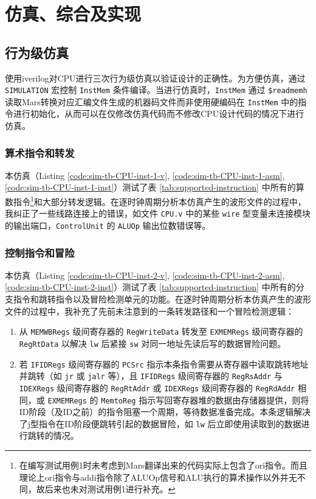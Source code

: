 \section{仿真、综合及实现}

\subsection{行为级仿真}
使用iverilog对CPU进行三次行为级仿真以验证设计的正确性。为方便仿真，通过 \lstinline|SIMULATION| 宏控制 \lstinline|InstMem| 条件编译。当进行仿真时，\lstinline|InstMem| 通过 \lstinline|$readmemh| 读取Mars转换对应汇编文件生成的机器码文件而非使用硬编码在 \lstinline|InstMem| 中的指令进行初始化，从而可以在仅修改仿真代码而不修改CPU设计代码的情况下进行仿真。

\subsubsection{算术指令和转发}
\label{subsubsec:sim-arithmetic-instructions}
本仿真（Listing \ref{code:sim-tb-CPU-inst-1-v}, \ref{code:sim-tb-CPU-inst-1-asm}, \ref{code:sim-tb-CPU-inst-1-inst}）测试了表 \ref{tab:supported-instruction} 中所有的算数指令\footnote{在编写测试用例1时未考虑到Mars翻译出来的代码实际上包含了ori指令。而且理论上ori指令与addi指令除了ALUOp信号和ALU执行的算术操作以外并无不同，故后来也未对测试用例1进行补充。}和大部分转发逻辑。在逐时钟周期分析本仿真产生的波形文件的过程中，我纠正了一些线路连接上的错误，如文件 \lstinline|CPU.v| 中的某些 \lstinline|wire| 型变量未连接模块的输出端口，\lstinline|ControlUnit| 的 \lstinline|ALUOp| 输出位数错误等。

\subsubsection{控制指令和冒险}
\label{subsubsec:sim-control-instructions}
本仿真（Listing \ref{code:sim-tb-CPU-inst-2-v}, \ref{code:sim-tb-CPU-inst-2-asm}, \ref{code:sim-tb-CPU-inst-2-inst}）测试了表 \ref{tab:supported-instruction} 中所有的分支指令和跳转指令以及冒险检测单元的功能。在逐时钟周期分析本仿真产生的波形文件的过程中，我补充了先前未注意到的一条转发路径和一个冒险检测逻辑：
\begin{enumerate}
    \item 从 \lstinline|MEMWBRegs| 级间寄存器的 \lstinline|RegWriteData| 转发至 \lstinline|EXMEMRegs| 级间寄存器的 \lstinline|RegRtData| 以解决 \lstinline|lw| 后紧接 \lstinline|sw| 对同一地址先读后写的数据冒险问题。
    \item 若 \lstinline|IFIDRegs| 级间寄存器的 \lstinline|PCSrc| 指示本条指令需要从寄存器中读取跳转地址并跳转（如 \lstinline|jr| 或 \lstinline|jalr| 等），且 \lstinline|IFIDRegs| 级间寄存器的 \lstinline|RegRsAddr| 与 \lstinline|IDEXRegs| 级间寄存器的 \lstinline|RegRtAddr| 或 \lstinline|IDEXRegs| 级间寄存器的 \lstinline|RegRdAddr| 相同，或 \lstinline|EXMEMRegs| 的 \lstinline|MemtoReg| 指示写回寄存器堆的数据由存储器提供，则将ID阶段（及ID之前）的指令阻塞一个周期，等待数据准备完成。本条逻辑解决了j型指令在ID阶段便跳转引起的数据冒险，如 \lstinline|lw| 后立即使用读取到的数据进行跳转的情况。
\end{enumerate}

